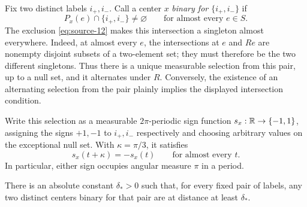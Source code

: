 Fix two distinct labels \(i_+,i_-\).  Call a center \(x\)
\emph{binary for \(\{i_+,i_-\}\)} if
\[
 P_x(e)\cap\{i_+,i_-\}\ne\varnothing
 \qquad\text{for almost every }e\in S.
\]
The exclusion \eqref{eq:source-12} makes this intersection a singleton
almost everywhere.  Indeed, at almost every \(e\), the intersections
at \(e\) and \(Re\) are nonempty disjoint subsets of a two-element set;
they must therefore be the two different singletons.  Thus there is a
unique measurable selection from this pair, up to a null set, and it
alternates under \(R\).  Conversely, the existence of an alternating
selection from the pair plainly implies the displayed intersection
condition.

Write this selection as a measurable \(2\pi\)-periodic sign function
\(s_x:\mathbb R\to\{-1,1\}\), assigning the signs \(+1,-1\) to \(i_+,i_-\)
respectively and choosing arbitrary values on the exceptional null
set.  With \(\kappa=\pi/3\), it satisfies
\begin{equation}\label{eq:palettes-binary-signs}
 s_x(t+\kappa)=-s_x(t)
 \qquad\text{for almost every }t.
\end{equation}
In particular, either sign occupies angular measure \(\pi\) in a
period.

\begin{lemma}\label{lem:binary-separation}
There is an absolute constant \(\delta_*>0\) such that, for every
fixed pair of labels, any two distinct centers binary for that pair
are at distance at least \(\delta_*\).
\end{lemma}

